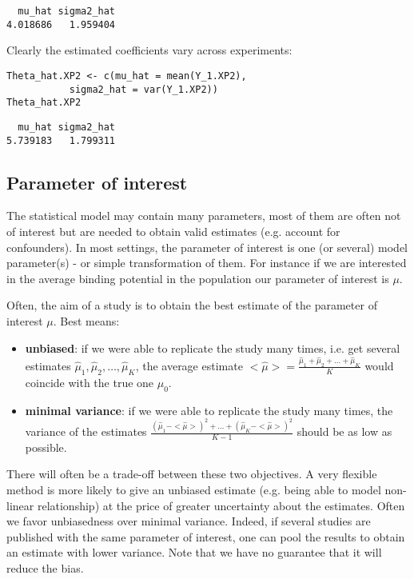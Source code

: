 \documentclass{article}
\begin{document}
\begin{verbatim}
  mu_hat sigma2_hat 
4.018686   1.959404
\end{verbatim}

Clearly the estimated coefficients vary across experiments:
\lstset{language=r,label= ,caption= ,captionpos=b,numbers=none}
\begin{lstlisting}
Theta_hat.XP2 <- c(mu_hat = mean(Y_1.XP2),
		   sigma2_hat = var(Y_1.XP2))
Theta_hat.XP2
\end{lstlisting}

\begin{verbatim}
  mu_hat sigma2_hat 
5.739183   1.799311
\end{verbatim}

\subsection{Parameter of interest}
\label{sec:orgf99054a}

The statistical model may contain many parameters, most of them are
often not of interest but are needed to obtain valid estimates
(e.g. account for confounders). In most settings, the parameter of
interest is one (or several) model parameter(s) - or simple
transformation of them. For instance if we are interested in the
average binding potential in the population our parameter of interest
is \(\mu\).

\bigskip

Often, the aim of a study is to obtain the best estimate of the
parameter of interest \(\mu\). Best means:
\begin{itemize}
\item \textbf{unbiased}: if we were able to replicate the study many times,
i.e. get several estimates \(\hat{\mu}_1,\hat{\mu}_2,\ldots,\hat{\mu}_K\), the
average estimate \(<\hat{\mu}>=\frac{\hat{\mu}_1+\hat{\mu}_2+\ldots+\hat{\mu}_K}{K}\) would coincide with the true one \(\mu_0\).
\item \textbf{minimal variance}: if we were able to replicate the study many
times, the variance of the estimates
\(\frac{(\hat{\mu}_1-<\hat{\mu}>)^2+\ldots+(\hat{\mu}_K-<\hat{\mu}>)^2}{K-1}\)
should be as low as possible.
\end{itemize}

There will often be a trade-off between these two objectives. A very
flexible method is more likely to give an unbiased estimate
(e.g. being able to model non-linear relationship) at the price of
greater uncertainty about the estimates. Often we favor unbiasedness
over minimal variance. Indeed, if several studies are published with
the same parameter of interest, one can pool the results to obtain an
estimate with lower variance. Note that we have no guarantee that it
will reduce the bias.
\end{document}
